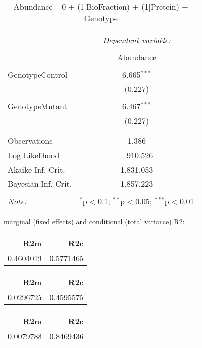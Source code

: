 \documentclass[11pt]{report}
\begin{document}
\begin{table}[!htbp] \centering 
  \caption{Abundance ~ 0 + (1|BioFraction) + (1|Protein) + Genotype} 
  \label{} 
\begin{tabular}{@{\extracolsep{5pt}}lc} 
\\[-1.8ex]\hline 
\hline \\[-1.8ex] 
 & \multicolumn{1}{c}{\textit{Dependent variable:}} \\ 
\cline{2-2} 
\\[-1.8ex] & Abundance \\ 
\hline \\[-1.8ex] 
 GenotypeControl & 6.665$^{***}$ \\ 
  & (0.227) \\ 
  & \\ 
 GenotypeMutant & 6.467$^{***}$ \\ 
  & (0.227) \\ 
  & \\ 
\hline \\[-1.8ex] 
Observations & 1,386 \\ 
Log Likelihood & $-$910.526 \\ 
Akaike Inf. Crit. & 1,831.053 \\ 
Bayesian Inf. Crit. & 1,857.223 \\ 
\hline 
\hline \\[-1.8ex] 
\textit{Note:}  & \multicolumn{1}{r}{$^{*}$p$<$0.1; $^{**}$p$<$0.05; $^{***}$p$<$0.01} \\ 
\end{tabular} 
\end{table} 
marginal (fixed effects) and conditional (total variance) R2:

\begin{tabular}{r|r}
\hline
R2m & R2c\\
\hline
0.4604019 & 0.5771465\\
\hline
\end{tabular}

\begin{tabular}{r|r}
\hline
R2m & R2c\\
\hline
0.0296725 & 0.4595575\\
\hline
\end{tabular}

\begin{tabular}{r|r}
\hline
R2m & R2c\\
\hline
0.0079788 & 0.8469436\\
\hline
\end{tabular}
\end{document}
